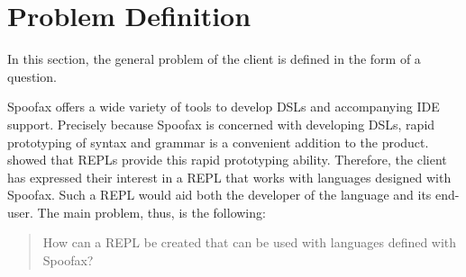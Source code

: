 \section{Problem Definition}
\label{sec:problem-definition}

In this section, the general problem of the client is defined in the
form of a question.

Spoofax offers a wide variety of tools to develop DSLs and accompanying IDE
support. Precisely because Spoofax is concerned with developing DSLs, rapid
prototyping of syntax and grammar is a convenient addition to the product.
 showed that REPLs provide this rapid prototyping
ability.  Therefore, the client has expressed their interest in a REPL that
works with languages designed with Spoofax. Such a REPL would aid both the
developer of the language and its end-user. The main problem, thus, is the
following:

\begin{quote}
  How can a REPL be created that can be used with languages defined
  with Spoofax?
\end{quote}

